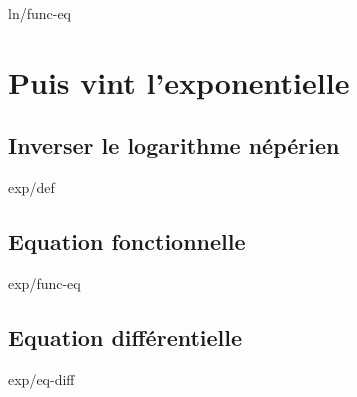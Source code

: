 \documentclass[12pt]{amsart}
\begin{document}
	{ln/func-eq}




\section{Puis vint l'exponentielle}

	\subsection{Inverser le logarithme népérien}

	{exp/def}


	\subsection{Equation fonctionnelle}

	{exp/func-eq}


	\subsection{Equation différentielle}

	{exp/eq-diff}
\end{document}
